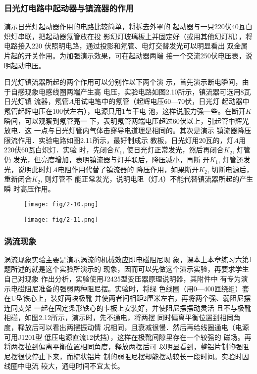 \subsubsection{日光灯电路中起动器与镇流器的作用}
演示日光灯起动器作用的电路比较简单，将拆去外罩的
起动器与一只220伏40瓦白炽灯串联，把起动器氖管放在投
影幻灯玻璃板上并固定好（或用其他幻灯机），将电路接入220
伏照明电路，通过投影和氖管、电灯交替发光可以明显看出
双金属片起的开关作用。为加强演示效果，可在起动器两端
接一个交流250伏电压表，说明起动电压。

日光灯镇流器所起的两个作用可以分别作以下两个演
示，首先演示断电瞬间，由于自感现象电感线圈两端产生高
电压，实验电路如图2.10所示，镇流器可选用8瓦日光灯镇
流器，氖管$A$用试电笔中的氖管（起辉电压60—70伏，日光灯
起动器中氖管起辉电压在100伏左右），电源只用1节干电
池，这样说服力强一些。在断开$K$瞬间，可以观察到氖管亮一
下，表明氖管两端电压超过60伏以上，引起管中辉光放电．这
一点与日光灯管内气体击穿导电道理是相同的。其次是演示
镇流器降压限流作用．实验电路如图2.11所示，最好制成示
教板，日光灯用20瓦的，灯$A$用220伏60瓦白炽灯．实验
时，先闭合$K_1$, 使日光灯正常发光，然后再闭合$K_2$, 灯管仍
发光，但亮度增加，表明镇流器与灯并联后，降压减小，再断
开$K_1$, 灯管还发光，说明此时灯$A$电阻作用代替了镇流器的
降压作用，如果断开$K_2$, 切断电源后，重新闭合$K_2$, 则灯管不
能正常发光，说明电阻（灯$A$）不能代替镇流器所起的产生瞬
时高压作用。

\begin{figure}[htp]\centering
    \begin{minipage}[t]{0.48\textwidth}
    \centering
\texttt{[image: fig/2-10.png]}
    \caption{}
    \end{minipage}
    \begin{minipage}[t]{0.48\textwidth}
    \centering
\texttt{[image: fig/2-11.png]}
    \caption{}
    \end{minipage}
    \end{figure}

\subsubsection{涡流现象}
涡流现象实验主要是演示涡流的机械效应即电磁阻尼现
象，课本上本章练习六第1题所述的就是这个实验所演示的
现象，因而可以先做这个演示实验，再要求学生自己对现象
作出分析，实验使用J2425型变压器原理说明器，其附件中
有专为演示电磁阻尼准备的强弱两种阻尼摆。实验时，将绿
色线圈（用0—400匝绕组）套在U型铁心上，装好两块极靴
并使两者间相距2厘米左右，再将两个强、弱阻尼摆连同支架
一起在固定条形铁心的卡板上安装好，并使阻尼摆摆动灵活
且不与极靴相碰，如图2.12所示，演示时，先不通电，将两摆
同时偏离平衡位置到相同角度，释放后可以看出两摆振动情
况相同，且衰减很慢．然后再给线圈通电（电源可用J1201型
低压电源直流12伏挡），这样在极靴间隙里存在一个较强的
磁场。再将两摆拉到偏离平衡位置相同角度，释放两摆后可
以明显看到，整铝片制的强阻尼摆很快停止下来，而梳状铝片
制的弱阻尼摆却能摆动较长一段时间。实验时因线圈中电流
较大，通电时间不宜太长。

